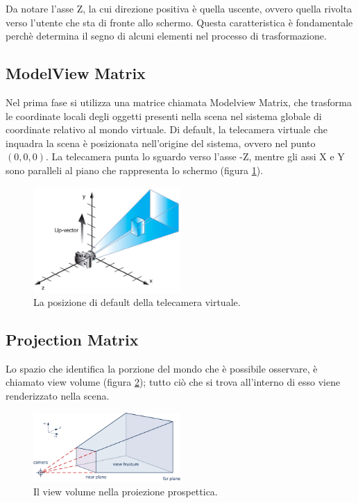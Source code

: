 Da notare l'asse Z, la cui direzione positiva è quella uscente, ovvero quella rivolta verso l'utente che sta di fronte allo schermo. Questa caratteristica è fondamentale perchè determina il segno di alcuni elementi nel processo di trasformazione.

\subsection{ModelView Matrix}
Nel prima fase si utilizza una matrice chiamata Modelview Matrix, che trasforma le coordinate locali degli oggetti presenti nella scena nel sistema globale di coordinate relativo al mondo virtuale. Di default, la telecamera virtuale che inquadra la scena è posizionata nell'origine del sistema, ovvero nel punto $(0,0,0)$. La telecamera punta lo sguardo verso l'asse -Z, mentre gli assi X e Y sono paralleli al piano che rappresenta lo schermo (figura \ref{cam-default}).

\begin{figure}[htbp]
\centering
\includegraphics[width=0.5\textwidth]{images/frustum/camera-default.jpg}
\caption{La posizione di default della telecamera virtuale.\label{cam-default}}
\end{figure}


\subsection{Projection Matrix}
Lo spazio che identifica la porzione del mondo che è possibile osservare, è chiamato view volume (figura \ref{view-frustum}); tutto ciò che si trova all'interno di esso viene renderizzato nella scena.

\begin{figure}[htbp]
\centering
\includegraphics[width=0.5\textwidth]{images/frustum/view_frustum.png}
\caption{Il view volume nella proiezione prospettica.\label{view-frustum}}
\end{figure}

